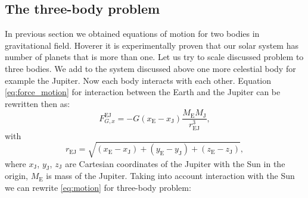 \documentclass[10pt]{article}
\begin{document}
\subsection{The three-body problem}
In previous section we obtained equations of motion for two bodies in gravitational field. Hoverer it is experimentally proven that our solar system has number of planets that is more than one. Let us try to scale discussed problem to three bodies.
We add to the system discussed above one more celestial body for example the Jupiter. Now each body interacts with each other.
Equation \ref{eq:force_motion} for interaction between the Earth and the Jupiter can be rewritten then as:
\begin{equation}\label{eq:motion_3body}
F_{G,x}^{\mathrm{EJ}}=-G(x_{\mathrm{E}}-x_{\mathrm{J}})\frac{M_{\mathrm{E}}M_{\mathrm{J}}}{r^3_{\mathrm{EJ}}},
\end{equation}
with 
\[
r_{\mathrm{EJ}}=\sqrt{(x_{\mathrm{E}}-x_{\mathrm{J}})+(y_{\mathrm{E}}-y_{\mathrm{J}})+(z_{\mathrm{E}}-z_{\mathrm{J}})},
\]
where $x_{\mathrm{J}}$, $y_{\mathrm{J}}$, $z_{\mathrm{J}}$ are Cartesian coordinates of the Jupiter with the Sun in the origin, $M_{\mathrm{E}}$ is mass of the Jupiter.
Taking into account interaction with the Sun we can rewrite \ref{eq:motion} for three-body problem:
\end{document}
